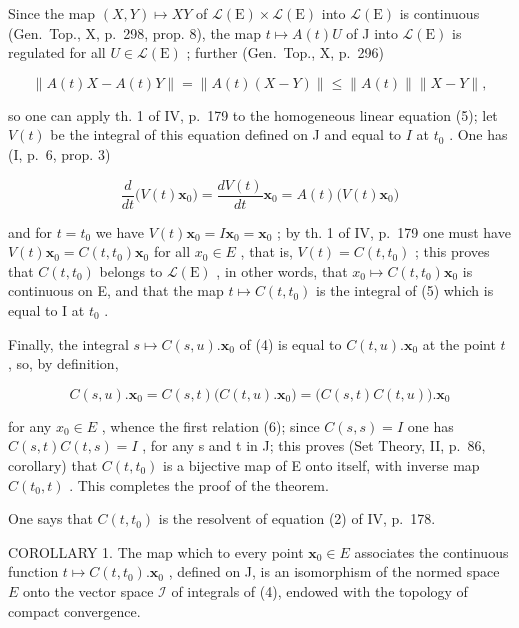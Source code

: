 Since the map \((X, Y) \mapsto XY\) of \(\mathcal{L}(\mathrm{E}) \times \mathcal{L}(\mathrm{E})\) into \(\mathcal{L}(\mathrm{E})\) is continuous (Gen.~Top., X, p.~298, prop. 8), the map \(t \mapsto A(t)U\) of J into \(\mathcal{L}(\mathrm{E})\) is regulated for all \(U \in \mathcal{L}(\mathrm{E})\) ; further (Gen.~Top., X, p.~296)

\[
\| A (t) X - A (t) Y \| = \| A (t) (X - Y) \| \leqslant \| A (t) \| \| X - Y \|,
\]

so one can apply th. 1 of IV, p.~179 to the homogeneous linear equation (5); let \(V(t)\) be the integral of this equation defined on J and equal to \(I\) at \(t_0\) . One has (I, p.~6, prop. 3)

\[
\frac {d}{d t} \big (V (t) \mathbf {x} _ {0} \big) = \frac {d V (t)}{d t} \mathbf {x} _ {0} = A (t) \big (V (t) \mathbf {x} _ {0} \big)
\]

and for \(t = t_{0}\) we have \(V(t)\mathbf{x}_{0} = I\mathbf{x}_{0} = \mathbf{x}_{0}\) ; by th. 1 of IV, p.~179 one must have \(V(t)\mathbf{x}_{0} = C(t, t_{0})\mathbf{x}_{0}\) for all \(x_{0} \in E\) , that is, \(V(t) = C(t, t_{0})\) ; this proves that \(C(t, t_{0})\) belongs to \(\mathcal{L}(\mathrm{E})\) , in other words, that \(x_{0} \mapsto C(t, t_{0})\mathbf{x}_{0}\) is continuous on E, and that the map \(t \mapsto C(t, t_{0})\) is the integral of (5) which is equal to I at \(t_{0}\) .

Finally, the integral \(s \mapsto C(s, u). \mathbf{x}_0\) of (4) is equal to \(C(t, u). \mathbf{x}_0\) at the point \(t\) , so, by definition,

\[
C (s, u). \mathbf {x} _ {0} = C (s, t) \bigl (C (t, u). \mathbf {x} _ {0} \bigr) = \bigl (C (s, t)   C (t, u) \bigr). \mathbf {x} _ {0}
\]

for any \(x_{0} \in E\) , whence the first relation (6); since \(C(s, s) = I\) one has \(C(s, t)C(t, s) = I\) , for any s and t in J; this proves (Set Theory, II, p.~86, corollary) that \(C(t, t_{0})\) is a bijective map of E onto itself, with inverse map \(C(t_{0}, t)\) . This completes the proof of the theorem.

One says that \(C(t, t_0)\) is the resolvent of equation (2) of IV, p.~178.

COROLLARY 1. The map which to every point \(\mathbf{x}_0 \in E\) associates the continuous function \(t \mapsto C(t, t_0). \mathbf{x}_0\) , defined on J, is an isomorphism of the normed space \(E\) onto the vector space \(\mathcal{I}\) of integrals of (4), endowed with the topology of compact convergence.

